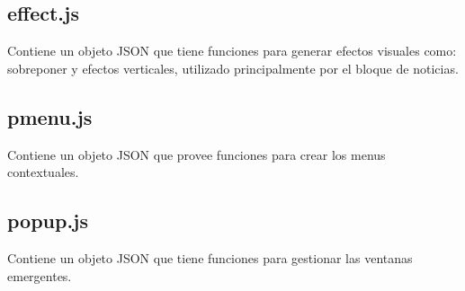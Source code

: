 \subsection{effect.js}
Contiene un objeto JSON que tiene funciones para generar efectos visuales como: sobreponer y efectos verticales, utilizado principalmente por el bloque de noticias.

\subsection{pmenu.js}
Contiene un objeto JSON que provee funciones para crear los menus contextuales.

\subsection{popup.js}
Contiene un objeto JSON que tiene funciones para gestionar las ventanas emergentes.

\clearpage
